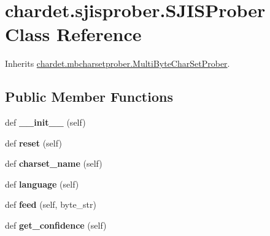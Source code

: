 \hypertarget{classchardet_1_1sjisprober_1_1_s_j_i_s_prober}{}\section{chardet.\+sjisprober.\+S\+J\+I\+S\+Prober Class Reference}
\label{classchardet_1_1sjisprober_1_1_s_j_i_s_prober}


Inherits \hyperlink{classchardet_1_1mbcharsetprober_1_1_multi_byte_char_set_prober}{chardet.\+mbcharsetprober.\+Multi\+Byte\+Char\+Set\+Prober}.

\subsection*{Public Member Functions}
\begin{DoxyCompactItemize}
\item 
\mbox{\label{classchardet_1_1sjisprober_1_1_s_j_i_s_prober_a06c4fa18360ce4f665e260899ae42da9}} 
def {\bfseries \+\_\+\+\_\+init\+\_\+\+\_\+} (self)
\item 
\mbox{\label{classchardet_1_1sjisprober_1_1_s_j_i_s_prober_add08847b96595b3c9cdc3db6e3914a9f}} 
def {\bfseries reset} (self)
\item 
\mbox{\label{classchardet_1_1sjisprober_1_1_s_j_i_s_prober_ae92bc33b4f0651b1327c4ed1f3410027}} 
def {\bfseries charset\+\_\+name} (self)
\item 
\mbox{\label{classchardet_1_1sjisprober_1_1_s_j_i_s_prober_ad188be37b014d1463e06c3a423974e0d}} 
def {\bfseries language} (self)
\item 
\mbox{\label{classchardet_1_1sjisprober_1_1_s_j_i_s_prober_a5ee86104f87ecd9013a8cb3a1db8a624}} 
def {\bfseries feed} (self, byte\+\_\+str)
\item 
\mbox{\label{classchardet_1_1sjisprober_1_1_s_j_i_s_prober_a31d2e5a3226aea99c9d4640552be8ebd}} 
def {\bfseries get\+\_\+confidence} (self)
\end{DoxyCompactItemize}
